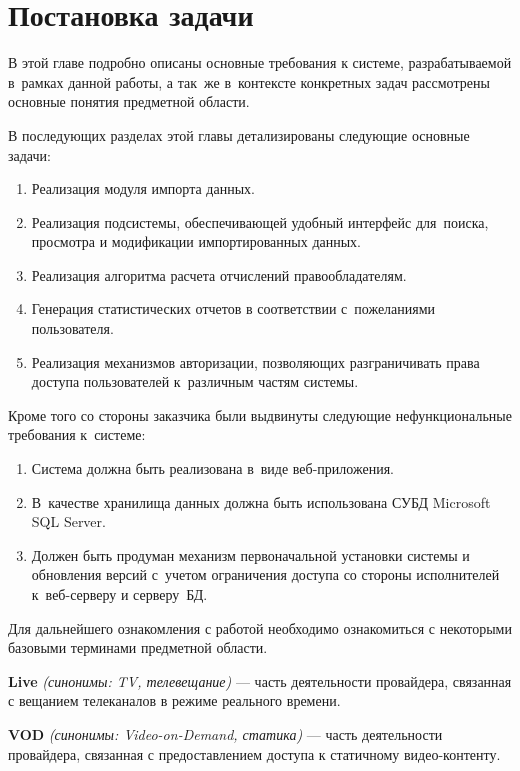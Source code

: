 \section{Постановка задачи}

В этой главе подробно описаны основные требования к системе, разрабатываемой в~рамках данной работы,
а так~же в~контексте конкретных задач рассмотрены основные понятия предметной области. 

В последующих разделах этой главы детализированы следующие основные задачи:

\begin{enumerate}
\item{
  Реализация модуля импорта данных.
}
\item{
  Реализация подсистемы, обеспечивающей удобный интерфейс для~поиска, просмотра и модификации импортированных данных.
}
\item{
  Реализация алгоритма расчета отчислений правообладателям. 
}
\item{
  Генерация статистических отчетов в соответствии с~пожеланиями пользователя.
}
\item{
  Реализация механизмов авторизации, позволяющих разграничивать права доступа пользователей к~различным частям системы.
}
\end{enumerate}

Кроме того со стороны заказчика были выдвинуты следующие нефункциональные требования к~системе:

\begin{enumerate}
\item{
  Система должна быть реализована в~виде веб-приложения.
}
\item{
  В~качестве хранилища данных должна быть использована СУБД Microsoft SQL Server.
}
\item{
  Должен быть продуман механизм первоначальной установки системы и обновления версий 
  с~учетом ограничения доступа со стороны исполнителей к~веб-серверу и серверу~БД.
}
\end{enumerate}

Для дальнейшего ознакомления с работой необходимо ознакомиться с некоторыми базовыми терминами предметной области.

\textbf{Live} \textit{(синонимы: TV, телевещание)} --- часть деятельности провайдера, связанная с вещанием
телеканалов в режиме реального времени.

\textbf{VOD} \textit{(синонимы: Video-on-Demand, статика)} --- часть деятельности провайдера, связанная 
с предоставлением доступа к статичному видео-контенту.


